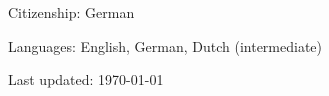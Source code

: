 \documentclass[a4paper]{article}
\def\footerlink{}
\renewenvironment{itemize}{
  \begin{list}{}{
    \setlength{\leftmargin}{1.5em}
  }
}{
  \end{list}
}
\begin{document}
\begin{itemize}
\item Citizenship: German
\item Languages: English, German, Dutch (intermediate)
\end{itemize}


\null\vfill %
\begin{center}
  \begin{footnotesize}
    Last updated: \today \\
    \href{\footerlink}{\texttt{\footerlink}}
  \end{footnotesize}
\end{center}
\end{document}
